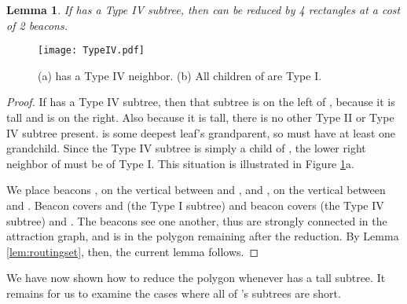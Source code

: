 \documentclass{article}
\newtheorem{lemma}{Lemma}
\begin{document}
		\begin{lemma}\label{lem:typeIV}
			If  has a Type IV subtree, then  can be reduced by 4 
			rectangles at a cost of 2 beacons.
		\end{lemma}
				
		\begin{figure}[htbp] 
			\begin{center}
				\texttt{[image: TypeIV.pdf]} 
			\end{center}
			\caption{ (a)  has a Type IV neighbor. 
					  (b) All children of  are Type I.}
			\label{fig:typefour}
		\end{figure}
		
		\begin{proof}
			If  has a Type IV subtree, then that subtree is on the left of ,
			because it is tall and  is on the right.  Also because it is tall, there
			is no other Type II or Type IV subtree present.
			 is some deepest leaf's grandparent, so  must have at least one
			grandchild. Since the Type IV subtree is simply a child of , the
			lower right neighbor of  must be of Type I.
			This situation is illustrated in Figure \ref{fig:typefour}a.
			
			We place beacons , on the vertical between
			 and , and , on the vertical between  and .
			Beacon  covers  and  (the Type I subtree)
			and beacon  covers  (the Type IV subtree) and .
			The beacons see one another, thus are strongly connected in the attraction
			graph, and  is in the polygon  remaining after the reduction.
			By Lemma \ref{lem:routingset}, then, the
			current lemma follows.
		\end{proof}
		
		We have now shown how to reduce the polygon whenever  has a tall subtree.
		It remains for us to examine the cases where all of 's subtrees are
		short.
		
\end{document}
